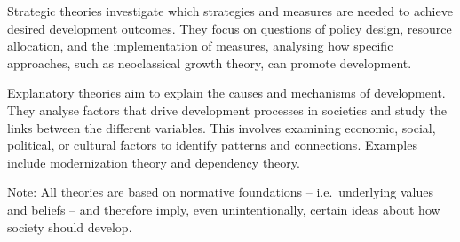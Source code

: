 \documentclass[
  a4paper,
  openany]{book}
\begin{document}
Strategic theories investigate which strategies and measures are needed
to achieve desired development outcomes. They focus on questions of
policy design, resource allocation, and the implementation of measures,
analysing how specific approaches, such as neoclassical growth theory,
can promote development.

Explanatory theories aim to explain the causes and mechanisms of
development. They analyse factors that drive development processes in
societies and study the links between the different variables. This
involves examining economic, social, political, or cultural factors to
identify patterns and connections. Examples include modernization theory
and dependency theory.

Note: All theories are based on normative foundations -- i.e.~underlying
values and beliefs -- and therefore imply, even unintentionally, certain
ideas about how society should develop.
\end{document}
